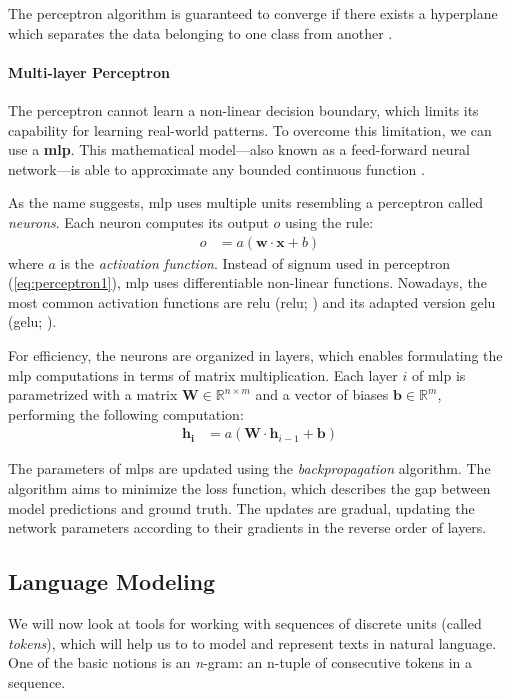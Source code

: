 The perceptron algorithm is guaranteed to converge if there exists a hyperplane which separates the data belonging to one class from another \cite{novikoff1962convergence}.

\paragraph{Multi-layer Perceptron} The perceptron cannot learn a non-linear decision boundary, which limits its capability for learning real-world patterns. To overcome this limitation, we can use a \textbf{\ac{mlp}}. This mathematical model---also known as a feed-forward neural network---is able to approximate any bounded continuous function \cite{hornik1989multilayer}.

As the name suggests, \ac{mlp} uses multiple units resembling a perceptron called \textit{neurons}. Each neuron computes its output $o$ using the rule:
\begin{align}
    o & = a(\mathbf{w} \cdot \mathbf{x} + b)
\end{align}
where $a$ is the \textit{activation function}. Instead of signum used in perceptron (\autoref{eq:perceptron1}), \ac{mlp} uses differentiable non-linear functions. Nowadays, the most common activation functions are \acl{relu} (\acs{relu}; \citealp{nair2010rectified}) and its adapted version \acl{gelu} (\acs{gelu}; \citealp{hendrycks2016gaussian}).

For efficiency, the neurons are organized in layers, which enables formulating the \ac{mlp} computations in terms of matrix multiplication. Each layer $i$ of \ac{mlp} is parametrized with a matrix $\mathbf{W} \in \mathbb{R}^{n\times m}$ and a vector of biases $\mathbf{b} \in \mathbb{R}^{m}$, performing the following computation:
\begin{align}
    \mathbf{h_i} & = a(\textbf{W} \cdot \mathbf{h}_{i-1} + \mathbf{b})
\end{align}

The parameters of \acp{mlp} are updated using the \textit{backpropagation} algorithm. The algorithm aims to minimize the loss function, which describes the gap between model predictions and ground truth. The updates are gradual, updating the network parameters according to their gradients in the reverse order of layers.


\subsection{Language Modeling}
\label{sec:lm-basics}
We will now look at tools for working with sequences of discrete units (called \textit{tokens}), which will help us to to model and represent texts in natural language. One of the basic notions is an \emph{n}-gram: an n-tuple of consecutive tokens in a sequence.

